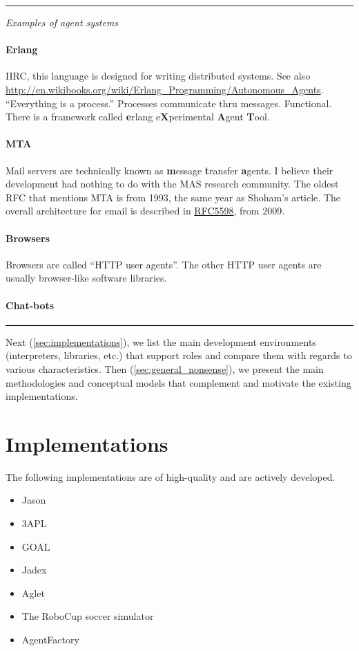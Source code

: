 \documentclass{article}
\newcommand{\fb}[1]{\textbf{#1}}
\newenvironment{notes}{\medskip\hrule\smallskip\narrower}{\smallskip\hrule\medskip}
\begin{document}
\begin{notes}
\emph{Examples of agent systems}

\paragraph{Erlang}
IIRC, this language is designed for writing distributed systems.
See also \url{http://en.wikibooks.org/wiki/Erlang_Programming/Autonomous_Agents}.
``Everything is a process.''
Processes communicate thru messages.
Functional.
There is a framework called \fb erlang e\fb Xperimental \fb Agent \fb Tool.

\paragraph{MTA}
Mail servers are technically known as \fb message \fb transfer \fb agents.
I believe their development had nothing to do with the MAS research community.
The oldest RFC that mentions MTA is from 1993, the same year as Shoham's article.
The overall architecture for email is described in \href{http://tools.ietf.org/html/rfc5598}{RFC5598}, from 2009.

\paragraph{Browsers}
Browsers are called ``HTTP user agents''.
The other HTTP user agents are usually browser-like software libraries.

\paragraph{Chat-bots}

\end{notes}

Next (\autoref{sec:implementations}), we list the main development environments (interpreters, libraries, etc.) that support roles and compare them with regards to various characteristics.
Then (\autoref{sec:general_nonsense}), we present the main methodologies and conceptual models  that complement and motivate the existing implementations.

\section{Implementations}\label{sec:implementations} %

The following implementations are of high-quality and are actively developed.
\begin{itemize}
\item Jason~\cite{books/sp/map2005/BordiniHV05}
\item 3APL~\cite{books/sp/map2005/DastaniRM05}
\item GOAL~\cite{hindriks2009programmingrationalagents}
\item Jadex~\cite{todo}
\item Aglet~\cite{todo}
\item The RoboCup soccer simulator
\item AgentFactory
\end{itemize}
\end{document}

